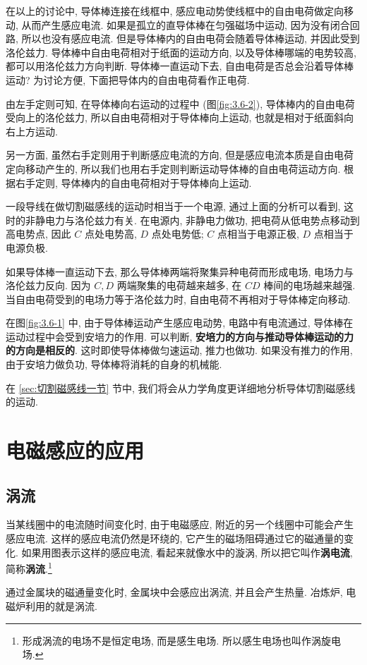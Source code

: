\documentclass[UTF8,openany,fontset=fandol]{ctexbook}
\theoremstyle{chinesetextbook}
\begin{document}
在以上的讨论中, 导体棒连接在线框中, 感应电动势使线框中的自由电荷做定向移动, 从而产生感应电流. 如果是孤立的直导体棒在匀强磁场中运动, 因为没有闭合回路, 所以也没有感应电流. 但是导体棒内的自由电荷会随着导体棒运动, 并因此受到洛伦兹力. 导体棒中自由电荷相对于纸面的运动方向, 以及导体棒哪端的电势较高, 都可以用洛伦兹力方向判断. 导体棒一直运动下去, 自由电荷是否总会沿着导体棒运动? 为讨论方便, 下面把导体内的自由电荷看作正电荷.

由左手定则可知, 在导体棒向右运动的过程中 (图\ref{fig:3.6-2}), 导体棒内的自由电荷受向上的洛伦兹力, 所以自由电荷相对于导体棒向上运动, 也就是相对于纸面斜向右上方运动.

另一方面, 虽然右手定则用于判断感应电流的方向, 但是感应电流本质是自由电荷定向移动产生的, 所以我们也用右手定则判断运动导体棒的自由电荷运动方向. 根据右手定则, 导体棒内的自由电荷相对于导体棒向上运动.

一段导线在做切割磁感线的运动时相当于一个电源, 通过上面的分析可以看到, 这时的非静电力与洛伦兹力有关. 在电源内, 非静电力做功, 把电荷从低电势点移动到高电势点, 因此 $C$ 点处电势高, $D$ 点处电势低; $C$ 点相当于电源正极, $D$ 点相当于电源负极.

如果导体棒一直运动下去, 那么导体棒两端将聚集异种电荷而形成电场, 电场力与洛伦兹力反向. 因为 $C,D$ 两端聚集的电荷越来越多, 在 $CD$ 棒间的电场越来越强. 当自由电荷受到的电场力等于洛伦兹力时, 自由电荷不再相对于导体棒定向移动.

在图\ref{fig:3.6-1} 中, 由于导体棒运动产生感应电动势, 电路中有电流通过, 导体棒在运动过程中会受到安培力的作用. 可以判断, \textbf{安培力的方向与推动导体棒运动的力的方向是相反的}. 这时即使导体棒做匀速运动, 推力也做功. 如果没有推力的作用, 由于安培力做负功, 导体棒将消耗的自身的机械能.

在 \ref{sec:切割磁感线一节} 节中, 我们将会从力学角度更详细地分析导体切割磁感线的运动.
\section{电磁感应的应用}
\subsection{涡流}\label{sec:涡流}
当某线圈中的电流随时间变化时, 由于电磁感应, 附近的另一个线圈中可能会产生感应电流. 这样的感应电流仍然是环绕的, 它产生的磁场阻碍通过它的磁通量的变化. 如果用图表示这样的感应电流, 看起来就像水中的漩涡, 所以把它叫作\textbf{涡电流}, 简称\textbf{涡流}.\footnote{形成涡流的电场不是恒定电场, 而是感生电场. 所以感生电场也叫作涡旋电场.}

通过金属块的磁通量变化时, 金属块中会感应出涡流, 并且会产生热量. 冶炼炉, 电磁炉利用的就是涡流.
\end{document}
